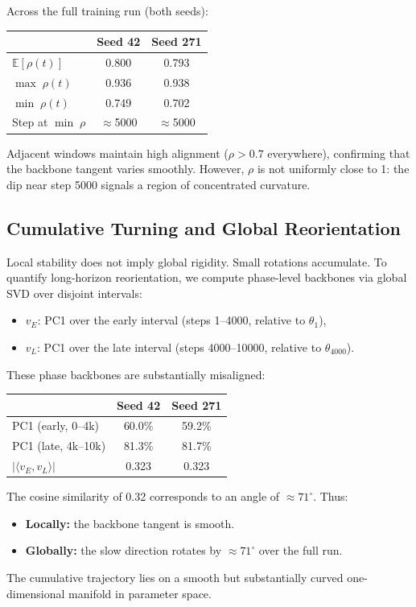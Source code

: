 \documentclass[11pt,a4paper]{article}
\begin{document}
Across the full training run (both seeds):
%
\begin{center}
\begin{tabular}{lcc}
\toprule
 & Seed 42 & Seed 271 \\
\midrule
$\mathbb{E}[\rho(t)]$ & 0.800 & 0.793 \\
$\max\;\rho(t)$ & 0.936 & 0.938 \\
$\min\;\rho(t)$ & 0.749 & 0.702 \\
Step at $\min\;\rho$ & $\approx$5000 & $\approx$5000 \\
\bottomrule
\end{tabular}
\end{center}

Adjacent windows maintain high alignment ($\rho > 0.7$ everywhere), confirming that the backbone tangent varies smoothly. However, $\rho$ is not uniformly close to 1: the dip near step 5000 signals a region of concentrated curvature.


\subsection{Cumulative Turning and Global Reorientation}

Local stability does not imply global rigidity. Small rotations accumulate. To quantify long-horizon reorientation, we compute phase-level backbones via global SVD over disjoint intervals:
%
\begin{itemize}
\item $v_E$: PC1 over the early interval (steps 1--4000, relative to $\theta_1$),
\item $v_L$: PC1 over the late interval (steps 4000--10000, relative to $\theta_{4000}$).
\end{itemize}

These phase backbones are substantially misaligned:
%
\begin{center}
\begin{tabular}{lcc}
\toprule
 & Seed 42 & Seed 271 \\
\midrule
PC1 (early, 0--4k) & 60.0\% & 59.2\% \\
PC1 (late, 4k--10k) & 81.3\% & 81.7\% \\
$|\langle v_E, v_L \rangle|$ & 0.323 & 0.323 \\
\bottomrule
\end{tabular}
\end{center}

The cosine similarity of 0.32 corresponds to an angle of $\approx 71^{\circ}$. Thus:
%
\begin{itemize}
\item \textbf{Locally:} the backbone tangent is smooth.
\item \textbf{Globally:} the slow direction rotates by $\approx 71^{\circ}$ over the full run.
\end{itemize}
%
The cumulative trajectory lies on a smooth but substantially curved one-dimensional manifold in parameter space.
\end{document}
